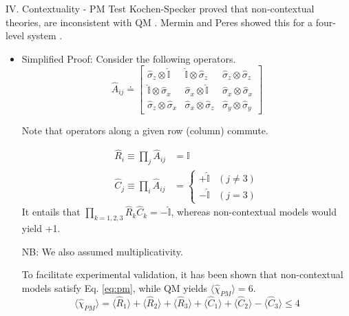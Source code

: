 \documentclass[final,hyperref={pdfpagelabels=false}]{beamer}
\newcommand{\mean}[1]{\langle #1 \rangle}
\begin{document}
\begin{frame}[t]
\begin{columns}[c]
\begin{column}{.69\textwidth}
\begin{columns}[c]
\begin{column}{.46\textwidth}
\begin{block}{IV. Contextuality - PM Test}
            Kochen-Specker proved that non-contextual theories, are inconsistent with QM \cite{Koc}. Mermin and Peres showed this for a four-level system \cite{PeresContext}.
            \begin{itemize}
            \item Simplified Proof: Consider the following operators. 
              \[
              \hat A_{ij} \doteq \left[
                \begin{array}{ccc}
                  \hat \sigma_z\otimes \mathbb {\hat I} &  \mathbb {\hat I} \otimes \hat \sigma_z & \hat \sigma_z\otimes \hat \sigma_ z \\
                  \mathbb {\hat I} \otimes \hat \sigma_x &  \hat \sigma_x \otimes \mathbb {\hat I} & \hat \sigma_x\otimes \hat \sigma_x \\
                  \hat \sigma_z \otimes \hat \sigma_x &  \hat \sigma_x \otimes \hat \sigma_z & \hat \sigma_y\otimes \hat \sigma_y
                \end{array} \right]
              \]


              Note that operators along a given row (column) commute. 
              
              \begin{align}
                \hat R_i\equiv \prod_j \hat A_{ij} & = \mathbb{I} \\
                \hat C_j\equiv \prod_i \hat A_{ij} & = 
                                           \begin{cases} 
                                             +\mathbb{\hat I} &  (j\neq 3)\\
                                             -\mathbb{\hat I} &  (j=3)
                                           \end{cases} 
              \end{align}
              It entails that $\prod_{k=1,2,3}\hat R_k \hat C_k= -\mathbb{\hat I}$, whereas non-contextual models would yield +1.

              NB: We also assumed multiplicativity. 

              To facilitate experimental validation, it has been shown that non-contextual models satisfy Eq. \ref{eq:pm}, while QM yields $\mean{\hat \chi_{PM}}=6$.
              \begin{equation}
                \mean{\hat \chi_{PM}} = \mean{\hat R_1} + \mean{\hat R_2} + \mean{\hat R_3} + \mean{\hat C_1} + \mean{\hat C_2} - \mean{\hat C_3} \le 4
                \label{eq:pm}
              \end{equation}


\end{itemize}
\end{block}
\end{column}
\end{columns}
\end{column}
\end{columns}
\end{frame}
\end{document}
